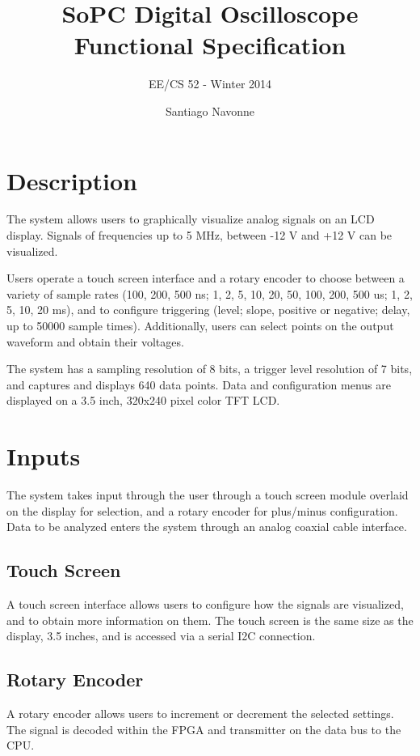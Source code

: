 \documentclass{scrartcl}
\begin{document}

	\title{SoPC Digital Oscilloscope Functional Specification}
	\subtitle{EE/CS 52 - Winter 2014}
	\author{Santiago Navonne} 
	\date{} 
	\maketitle
	
	\section*{Description}
	The system allows users to graphically visualize analog signals on an LCD display. Signals of frequencies up to 5 MHz, between -12 V and +12 V can be visualized.

	Users operate a touch screen interface and a rotary encoder to choose between a variety of sample rates (100, 200, 500 ns; 1, 2, 5, 10, 20, 50, 100, 200, 500 us; 1, 2, 5, 10, 20 ms), and to configure triggering (level; slope, positive or negative; delay, up to 50000 sample times). Additionally, users can select points on the output waveform and obtain their voltages.

	The system has a sampling resolution of 8 bits, a trigger level resolution of 7 bits, and captures and displays 640 data points. Data and configuration menus are displayed on a 3.5 inch, 320x240 pixel color TFT LCD.
	
	\section*{Inputs}
	The system takes input through the user through a touch screen module overlaid on the display for selection, and a rotary encoder for plus/minus configuration. Data to be analyzed enters the system through an analog coaxial cable interface.
	
	\subsection*{Touch Screen}
	A touch screen interface allows users to configure how the signals are visualized, and to obtain more information on them.
	The touch screen is the same size as the display, 3.5 inches, and is accessed via a serial I2C connection.
	
	\subsection*{Rotary Encoder}
	A rotary encoder allows users to increment or decrement the selected settings. The signal is decoded within the FPGA and transmitter on the data bus to the CPU.
\end{document}
